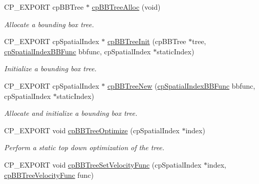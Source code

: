 \begin{DoxyCompactItemize}
C\+P\+\_\+\+E\+X\+P\+O\+RT cp\+B\+B\+Tree $\ast$ \hyperlink{group__cpSpatialIndex_gab596db9af8a27a956bc656c77de44cea}{cp\+B\+B\+Tree\+Alloc} (void)
\begin{DoxyCompactList}\small\item\em Allocate a bounding box tree. \end{DoxyCompactList}\item 
\mbox{\label{group__cpSpatialIndex_gae8339c806b4cbe4dec020a6471e8fce0}} 
C\+P\+\_\+\+E\+X\+P\+O\+RT cp\+Spatial\+Index $\ast$ \hyperlink{group__cpSpatialIndex_gae8339c806b4cbe4dec020a6471e8fce0}{cp\+B\+B\+Tree\+Init} (cp\+B\+B\+Tree $\ast$tree, \hyperlink{group__cpSpatialIndex_gaa8cf991cadcee1fbb6ee9379a0a6e0ea}{cp\+Spatial\+Index\+B\+B\+Func} bbfunc, cp\+Spatial\+Index $\ast$static\+Index)
\begin{DoxyCompactList}\small\item\em Initialize a bounding box tree. \end{DoxyCompactList}\item 
\mbox{\label{group__cpSpatialIndex_ga1bc8470262b641a4577100517a152b34}} 
C\+P\+\_\+\+E\+X\+P\+O\+RT cp\+Spatial\+Index $\ast$ \hyperlink{group__cpSpatialIndex_ga1bc8470262b641a4577100517a152b34}{cp\+B\+B\+Tree\+New} (\hyperlink{group__cpSpatialIndex_gaa8cf991cadcee1fbb6ee9379a0a6e0ea}{cp\+Spatial\+Index\+B\+B\+Func} bbfunc, cp\+Spatial\+Index $\ast$static\+Index)
\begin{DoxyCompactList}\small\item\em Allocate and initialize a bounding box tree. \end{DoxyCompactList}\item 
\mbox{\label{group__cpSpatialIndex_gab7b59516c70b93b7fb6d185c64bce301}} 
C\+P\+\_\+\+E\+X\+P\+O\+RT void \hyperlink{group__cpSpatialIndex_gab7b59516c70b93b7fb6d185c64bce301}{cp\+B\+B\+Tree\+Optimize} (cp\+Spatial\+Index $\ast$index)
\begin{DoxyCompactList}\small\item\em Perform a static top down optimization of the tree. \end{DoxyCompactList}\item 
\mbox{\label{group__cpSpatialIndex_ga5be19704958930441d558dfaeb2e83d5}} 
C\+P\+\_\+\+E\+X\+P\+O\+RT void \hyperlink{group__cpSpatialIndex_ga5be19704958930441d558dfaeb2e83d5}{cp\+B\+B\+Tree\+Set\+Velocity\+Func} (cp\+Spatial\+Index $\ast$index, \hyperlink{group__cpSpatialIndex_ga5e805ddbe3cab9b92a6fbd933ff6e6b0}{cp\+B\+B\+Tree\+Velocity\+Func} func)

\end{DoxyCompactItemize}
